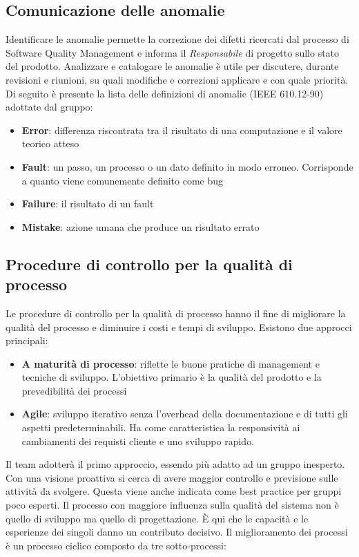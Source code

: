{  \subsection{Comunicazione delle anomalie}
  Identificare le anomalie permette la correzione dei difetti ricercati
  dal processo di Software Quality  Management e informa il  \emph{Responsabile}
  di  progetto sullo stato del prodotto. Analizzare e
  catalogare le anomalie è utile per discutere, durante revisioni e
  riunioni, su quali modifiche e correzioni applicare e con quale priorità. Di seguito è presente la lista delle definizioni di anomalie
  (IEEE 610.12-90) adottate dal gruppo:
  \begin{itemize}
  \item \textbf{Error}: differenza riscontrata tra il risultato di una computazione e il valore teorico atteso
  \item \textbf{Fault}: un passo, un processo o un dato definito in modo
    erroneo. Corrisponde a quanto viene comunemente definito come bug
  \item \textbf{Failure}: il risultato di un fault
  \item \textbf{Mistake}: azione umana che produce un risultato errato
  \end{itemize}


  \subsection{Procedure di controllo per la qualità di processo}
  Le procedure di controllo per la qualità di processo hanno il fine di migliorare la qualità del
  processo e diminuire i costi e tempi di sviluppo. Esistono due
  approcci principali:
  \begin{itemize}
  \item \textbf{A maturità di processo}: riflette le buone pratiche di management e tecniche di sviluppo.
    L’obiettivo primario è la qualità del prodotto e la prevedibilità dei processi
  \item \textbf{Agile}: sviluppo iterativo senza l’overhead della
    documentazione e di tutti gli aspetti predeterminabili. Ha come
    caratteristica la responsività ai cambiamenti dei requisti cliente e
    uno sviluppo rapido.
  \end{itemize}
  Il team adotterà il primo approccio, essendo più adatto ad un gruppo inesperto. Con una visione
  proattiva si cerca di avere maggior controllo e previsione sulle attività da svolgere. Questa viene
  anche indicata come best practice per gruppi poco esperti.
  Il processo con maggiore influenza sulla qualità del sistema non è quello di sviluppo ma quello
  di progettazione. È qui che le capacità e le esperienze dei singoli danno un contributo decisivo.
  Il miglioramento dei processi è un processo ciclico composto da tre
  sotto-processi:

}
